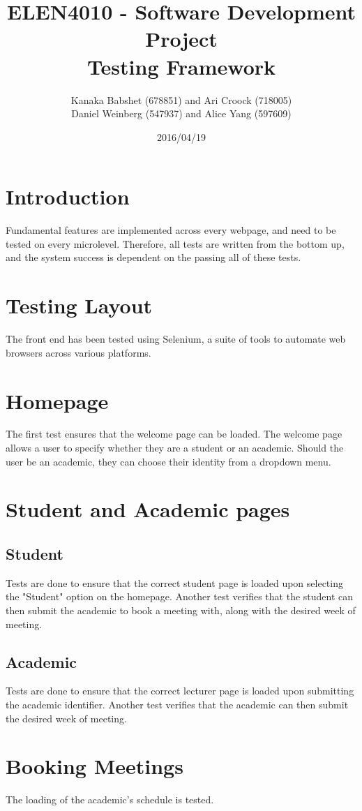 \documentclass[11pt, a4paper]{article}
\title{ELEN4010 - Software Development Project\\Testing Framework}
\author{Kanaka Babshet (678851) and Ari Croock (718005)\\Daniel Weinberg (547937) and Alice Yang (597609)}
\date{2016/04/19}
\begin{document}
\maketitle
\tableofcontents
\newpage
\noindent
\section{Introduction}
Fundamental features are implemented across every webpage, and need to be tested on every microlevel. Therefore, all tests are written from the bottom up, and the system success is dependent on the passing all of these tests. 

\section{Testing Layout}
The front end has been tested using Selenium, a suite of tools to automate web browsers across various platforms. 
\section{Homepage}
The first test ensures that the welcome page can be loaded. The welcome page allows a user to specify whether they are a student or an academic. Should the user be an academic, they can choose their identity from a dropdown menu. 
\section{Student and Academic pages}
\subsection{Student}
Tests are done to ensure that the correct student page is loaded upon selecting the "Student" option on the homepage. Another test verifies that the student can then submit the academic to book a meeting with, along with the desired week of meeting. 
\subsection{Academic}
Tests are done to ensure that the correct lecturer page is loaded upon submitting the academic identifier. Another test verifies that the academic can then submit the desired week of meeting. 

\section{Booking Meetings}
The loading of the academic's schedule is tested. 
\end{document}
